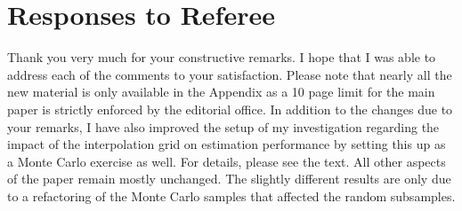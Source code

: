 \newpage\section*{Responses to Referee}\vspace{1.0cm}
Thank you very much for your constructive remarks. I hope that I was able to address each of the comments to your satisfaction. Please note that nearly all the new material is only available in the Appendix as a 10 page limit for the main paper is strictly enforced by the editorial office. In addition to the changes due to your remarks, I have also improved the setup of my investigation regarding the impact of the interpolation grid on estimation performance by setting this up as a Monte Carlo exercise as well. For details, please see the text. All other aspects of the paper remain mostly unchanged. The slightly different results are only due to a refactoring of the Monte Carlo samples that affected the random subsamples.

